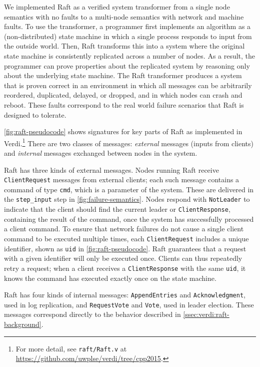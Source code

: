 We implemented Raft as a verified system transformer
from a single node semantics with no faults
to a multi-node semantics with network and machine faults.
To use the transformer,
a programmer first implements an algorithm as a (non-distributed) state machine
in which a single process responds to input from the outside world.
Then, Raft transforms this into a system where the original state machine
is consistently replicated across a number of nodes.
As a result, the programmer can prove properties about the replicated system
by reasoning only about the underlying state machine.
The Raft transformer produces a system that is proven correct in
an environment in which
all messages can be arbitrarily reordered, duplicated, delayed, or dropped,
and in which nodes can crash and reboot.
These faults correspond to the real world failure scenarios
that Raft is designed to tolerate.

\cref{fig:raft-pseudocode} shows signatures for key parts of
Raft as implemented in Verdi.\footnote{For
    more detail, see \texttt{raft/Raft.v} at
    \url{https://github.com/uwplse/verdi/tree/cpp2015}.}
There are two classes of messages:
\textit{external} messages (inputs from clients) and
\textit{internal} messages exchanged between nodes in the system.

Raft has three kinds of external messages.
Nodes running Raft receive \texttt{ClientRequest} messages from external clients;
each such message contains a command of type \texttt{cmd},
which is a parameter of the system. These are delivered in the
\texttt{step\_input} step in \cref{fig:failure-semantics}.
Nodes respond with \texttt{NotLeader}
to indicate that the client should find the current leader
or \texttt{ClientResponse}, containing the result of the command,
once the system has successfully processed a client command.
To ensure that network failures do not cause
a single client command to be executed multiple times,
each \texttt{ClientRequest} includes a unique identifier,
shown as \texttt{uid} in \cref{fig:raft-pseudocode}.
Raft guarantees that a request with a given identifier
will only be executed once.
Clients can thus repeatedly retry a request;
when a client receives a \texttt{ClientResponse}
with the same \texttt{uid},
it knows the command has executed exactly once on the state machine.

Raft has four kinds of internal messages:
\texttt{AppendEntries} and \texttt{Acknowledgment},
used in log replication,
and \texttt{RequestVote} and \texttt{Vote},
used in leader election.
These messages correspond directly to the behavior described
in \cref{ssec:verdi:raft-background}.

